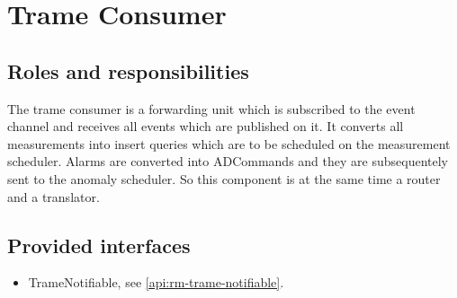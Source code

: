 \section{Trame Consumer}
\label{element:rm-trame-consumer}

\subsection{Roles and responsibilities}

\npar The trame consumer is a forwarding unit which is subscribed to the event
channel and receives all events which are published on it. It converts all
measurements into insert queries which are to be scheduled on the
measurement scheduler. Alarms are converted into ADCommands and they are
subsequentely sent to the anomaly scheduler. So this component is at the same
time a router and a translator.

\subsection{Provided interfaces}

\begin{itemize}
  \item TrameNotifiable, see \ref{api:rm-trame-notifiable}.
\end{itemize}

